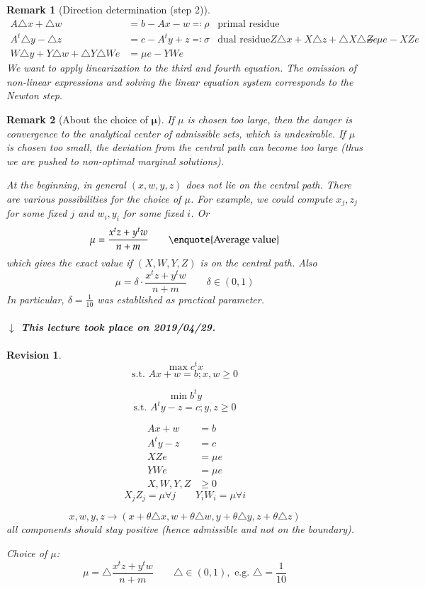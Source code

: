 \documentclass[a4paper]{article}
\numberwithin{lecref}{section}
\newtheorem*{Remark}{Remark}
\newtheorem*{Revision}{Revision}
\newcommand{\dateref}[1]{%
  \begin{mdframed}[backgroundcolor=gray!10,innerbottommargin=0pt,innertopmargin=0pt]
    \paragraph{\textit{$\downarrow$ This lecture took place on #1.}}%
  \end{mdframed}%
}
\begin{document}
\begin{Remark}[Direction determination (step 2)]
	\begin{align*}
		A \triangle x + \triangle w &= b - Ax - w \eqqcolon \rho & \text{primal residue} \\
		A^t \triangle y - \triangle z &= c - A^t y + z \eqqcolon \sigma & \text{dual residue}
		Z \triangle x + X \triangle z + \triangle X \triangle Z e &= \mu e - XZe \\
		W \triangle y + Y \triangle w + \triangle Y \triangle W e &= \mu e - YWe
	\end{align*}
	We want to apply linearization to the third and fourth equation.
	The omission of non-linear expressions and solving the linear equation system corresponds to the Newton step.
\end{Remark}

\begin{Remark}[About the choice of $\mathbf \mu$]
	If $\mu$ is chosen too large, then the danger is convergence to the analytical center of admissible sets, which is undesirable.
	If $\mu$ is chosen too small, the deviation from the central path can become too large (thus we are pushed to non-optimal marginal solutions).

	At the beginning, in general $(x, w, y, z)$ does not lie on the central path.
	There are various possibilities for the choice of $\mu$.
	For example, we could compute $x_j, z_j$ for some fixed $j$ and $w_i, y_i$ for some fixed $i$. Or
	\[ \mu = \frac{x^t z + y^t w}{n + m} \qquad \text{\enquote{Average value}} \]
	which gives the exact value if $(X, W, Y, Z)$ is on the central path. Also
	\[ \mu = \delta \cdot \frac{x^t z+ y^t w}{n + m} \qquad \delta \in (0, 1) \]
	In particular, $\delta = \frac1{10}$ was established as practical parameter.
\end{Remark}

\dateref{2019/04/29}

\begin{Revision}
	\[ \max c^t x \]
	\[ \text{s.t. } Ax + w = b; x, w \geq 0 \]

	\[ \min b^t y \]
	\[ \text{s.t. } A^t y - z = c; y, z \geq 0 \]

	\begin{align*}
		Ax + w &= b \\
		A^t y - z &= c \\
		XZe &= \mu e \\
		YWe &= \mu e \\
		X, W, Y, Z &\geq 0
	\end{align*}
	\[ X_j Z_j = \mu \forall j \qquad Y_i W_i = \mu \forall i \]

	\[ x, w, y, z \to (x + \theta \triangle x, w + \theta \triangle w, y + \theta \triangle y, z + \theta \triangle z) \]
	all components should stay positive (hence admissible and not on the boundary).

	Choice of $\mu$:
	\[ \mu = \triangle \frac{x^tz + y^tw}{n + m} \qquad \triangle \in (0, 1), \text{ e.g. } \triangle = \frac{1}{10} \]
\end{Revision}
\end{document}
